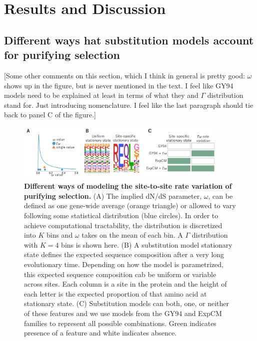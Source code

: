 \documentclass[11pt]{article}
\newcommand\jdbcomment[1]{{\color{red}[#1]}}
\begin{document}
\section*{Results and Discussion}

\subsection*{Different ways hat substitution models account for purifying selection}

\jdbcomment{Some other comments on this section, which I think in general is pretty good: $\omega$ shows up in the figure, but is never mentioned in the text. I feel like GY94 models need to be explained at least in terms of what they and $\Gamma$ distribution stand for. Just introducing nomenclature. I feel like the last paragraph should tie back to panel C of the figure.}

\begin{figure}[H]
\centerline{\includegraphics[width=0.90\textwidth]{figures/model_feature.pdf}}
\caption{\label{fig:model_feature}
\textbf{Different ways of modeling the site-to-site rate variation of purifying selection.}
(A) The implied dN/dS parameter, $\omega$, can be defined as one gene-wide average (orange triangle) or allowed to vary following some statistical distribution (blue circles). 
In order to achieve computational tractability, the distribution is discretized into $K$ bins and $\omega$ takes on the mean of each bin. 
A $\Gamma$ distribution with $K=4$ bins is shown here.
(B) A substitution model stationary state defines the expected sequence composition after a very long evolutionary time. 
Depending on how the model is parametrized, this expected sequence composition cab be uniform or variable across sites. 
Each column is a site in the protein and the height of each letter is the expected proportion of that amino acid at stationary state. 
(C) Substitution models can both, one, or neither of these features and we use models from the GY94 and ExpCM families to represent all possible combinations. 
Green indicates presence of a feature and white indicates absence. 
}
\end{figure}
\end{document}
